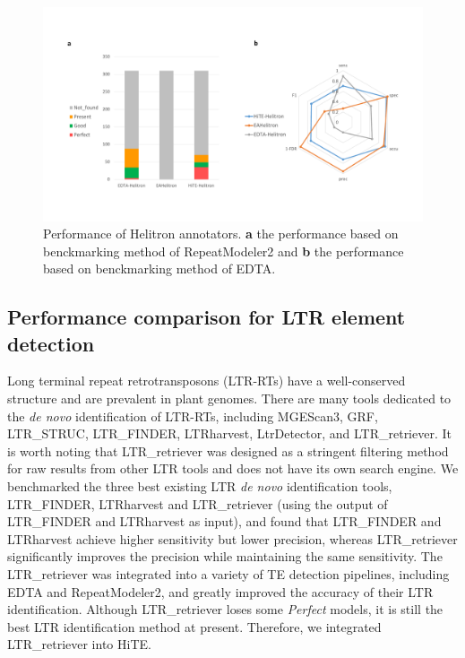 \documentclass{bmcart}
\begin{document}
\begin{figure}[h!]
	\centerline{\includegraphics[width=1.0\textwidth]{figures/HelitronResults.pdf}}
	\caption{Performance of Helitron annotators. \textbf{a} the performance based on benckmarking method of RepeatModeler2 and \textbf{b} the performance based on benckmarking method of EDTA.}
	\label{fig:helitron_results}
\end{figure}


\subsection*{Performance comparison for LTR element detection}
Long terminal repeat retrotransposons (LTR-RTs) have a well-conserved structure and are prevalent in plant genomes. There are many tools dedicated to the \emph{de novo} identification of LTR-RTs, including MGEScan3\cite{lee2016mgescan}, GRF, LTR\_STRUC\cite{mccarthy2003ltr_struc}, LTR\_FINDER\cite{xu2007ltr_finder}, LTRharvest\cite{ellinghaus2008ltrharvest}, LtrDetector\cite{valencia2019ltrdetector}, and LTR\_retriever\cite{ou2018ltr_retriever}. It is worth noting that LTR\_retriever was designed as a stringent filtering method for raw results from other LTR tools and does not have its own search engine. We benchmarked the three best existing LTR \emph{de novo} identification tools, LTR\_FINDER, LTRharvest and LTR\_retriever (using the output of LTR\_FINDER and LTRharvest as input), and found that LTR\_FINDER and LTRharvest achieve higher sensitivity but lower precision, whereas LTR\_retriever significantly improves the precision while maintaining the same sensitivity. The LTR\_retriever was integrated into a variety of TE detection pipelines, including EDTA and RepeatModeler2, and greatly improved the accuracy of their LTR identification. Although LTR\_retriever loses some \emph{Perfect} models, it is still the best LTR identification method at present. Therefore, we integrated LTR\_retriever into HiTE.
\end{document}
